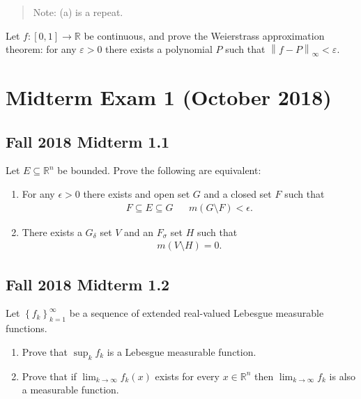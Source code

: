 \begin{quote}
Note: (a) is a repeat.
\end{quote}

Let \(f: [0, 1]\to {\mathbb{R}}\) be continuous, and prove the
Weierstrass approximation theorem: for any \({\varepsilon}> 0\) there
exists a polynomial \(P\) such that
\({\left\lVert {f - P} \right\rVert}_{\infty} < {\varepsilon}\).

\hypertarget{midterm-exam-1-october-2018}{%
\section{Midterm Exam 1 (October
2018)}\label{midterm-exam-1-october-2018}}

\hypertarget{fall-2018-midterm-1.1}{%
\subsection{Fall 2018 Midterm 1.1}\label{fall-2018-midterm-1.1}}

\label{equivalence_of_approximating_measures} Let
\(E \subseteq {\mathbb{R}}^n\) be bounded. Prove the following are
equivalent:

\begin{enumerate}
\def\labelenumi{\arabic{enumi}.}
\item
  For any \(\epsilon>0\) there exists and open set \(G\) and a closed
  set \(F\) such that
  \begin{align*}
  F \subseteq E \subseteq G && m(G\setminus F) < \epsilon
  .\end{align*}
\item
  There exists a \(G_ \delta\) set \(V\) and an \(F_ \sigma\) set \(H\)
  such that
  \begin{align*}
  m(V\setminus H) = 0
  .\end{align*}
\end{enumerate}

\hypertarget{fall-2018-midterm-1.2}{%
\subsection{Fall 2018 Midterm 1.2}\label{fall-2018-midterm-1.2}}

Let \(\left\{{ f_k }\right\} _{k=1}^{\infty }\) be a sequence of
extended real-valued Lebesgue measurable functions.

\begin{enumerate}
\def\labelenumi{\alph{enumi}.}
\item
  Prove that \(\sup_k f_k\) is a Lebesgue measurable function.
\item
  Prove that if \(\lim_{k \to \infty } f_k(x)\) exists for every
  \(x \in {\mathbb{R}}^n\) then \(\lim_{k\to \infty } f_k\) is also a
  measurable function.
\end{enumerate}

